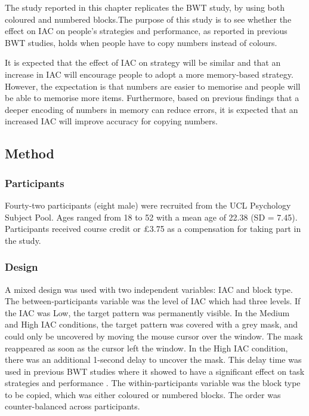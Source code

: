 \documentclass[11pt,oneside]{report}
\begin{document}
The study reported in this chapter replicates the BWT study, by using both coloured and numbered blocks.The purpose of this study is to see whether the effect on IAC on people's strategies and performance, as reported in previous BWT studies, holds when people have to copy numbers instead of colours.

It is expected that the effect of IAC on strategy will be similar and that an increase in IAC will encourage people to adopt a more memory-based strategy.  However, the expectation is that numbers are easier to memorise and people will be able to memorise more items. Furthermore, based on previous findings that a deeper encoding of numbers in memory can reduce errors, it is expected that an increased IAC will improve accuracy for copying numbers.


\subsection{Method}
\subsubsection{Participants}
Fourty-two participants (eight male) were recruited from the UCL Psychology Subject Pool. Ages ranged from 18 to 52 with a mean age of 22.38 (SD = 7.45). Participants received course credit or \pounds3.75 as a compensation for taking part in the study.

\subsubsection{Design}
A mixed design was used with two independent variables: IAC and block type.
The between-participants variable was the level of IAC which had three levels. If the IAC was Low, the target pattern was permanently visible. In the Medium and High IAC conditions, the target pattern was covered with a grey mask, and could only be uncovered by moving the mouse cursor over the window. The mask reappeared as soon as the cursor left the window. In the High IAC condition, there was an additional 1-second delay to uncover the mask. This delay time was used in previous BWT studies where it showed to have a significant effect on task strategies and performance \citep{Gray2006, Morgan2009, Waldron2007}.
The within-participants variable was the block type to be copied, which was either coloured or numbered blocks. The order was counter-balanced across participants.
\end{document}
